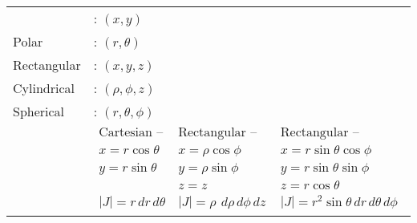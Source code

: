 \documentclass[11pt]{extarticle}
\newcommand{\dz}{{\,dz}}
\newcommand{\dr}{{\,dr}}
\newcommand{\dtheta}{{\,d\theta}}
\newcommand{\dphi}{{\,d\phi}}
\newcommand{\drho}{{\,d\rho}}
\begin{document}
\begin{tabularx}{\textwidth}{p{5cm}|X}
   \begin{tabular}{ll}
      Cartesian &: $(x,y)$ \\
      Polar &: $(r,\theta)$ \\
      Rectangular &: $(x,y,z)$ \\
      Cylindrical &: $(\rho,\phi,z)$ \\
      Spherical &: $(r,\theta,\phi)$ \\
   \end{tabular}
   &
   $\begin{array}{l|l|l}
      \text{Cartesian -- Polar} &
      \text{Rectangular -- Cylindrical} &
      \text{Rectangular -- Spherical}\\
      x=r\cos\theta & x=\rho\cos\phi & x=r\sin\theta\cos\phi\\
      y=r\sin\theta & y=\rho\sin\phi & y=r\sin\theta\sin\phi\\
      & z=z & z=r\cos\theta\\
      |J| = r \dr\dtheta & |J| = \rho\ \drho\dphi\dz & |J| = r^{2}\sin\theta \dr\dtheta\dphi
   \end{array}$
\end{tabularx}
\end{document}
